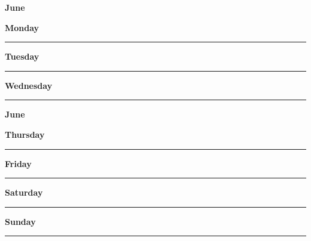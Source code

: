 \newpage

\textbf{\Large{June} \hfill \Large{}}
\vspace{0.3cm}

\begin{daybox}
 \textbf{Monday} \\
\rule{\linewidth}{0.02cm}
\end{daybox}

\begin{daybox}
\textbf{Tuesday} \\
\rule{\linewidth}{0.02cm}
\end{daybox}

\begin{daybox}
\textbf{Wednesday} \\
\rule{\linewidth}{0.02cm}
\end{daybox}

\newpage

\textbf{\Large{June} \hfill \Large{}}
\vspace{0.3cm}

\begin{daybox}
\textbf{Thursday} \\
\rule{\linewidth}{0.02cm}
\end{daybox}

\begin{daybox}
\textbf{Friday} \\
\rule{\linewidth}{0.02cm}
\end{daybox}

\begin{weekendbox}
\textbf{Saturday} \\
\rule{\linewidth}{0.02cm}
\tcblower
{}
\textbf{Sunday} \\
\rule{\linewidth}{0.02cm}
\end{weekendbox}